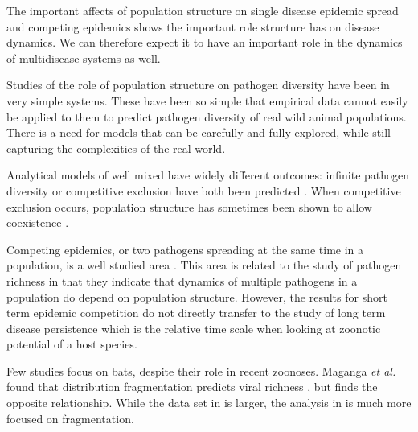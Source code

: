 The important affects of population structure on single disease epidemic spread and competing epidemics shows the important role structure has on disease dynamics.
We can therefore expect it to have an important role in the dynamics of multidisease systems as well.

 

Studies of the role of population structure on pathogen diversity have been in very simple systems.
These have been so simple that empirical data cannot easily be applied to them to predict pathogen diversity of real wild animal populations.
There is a need for models that can be carefully and fully explored, while still capturing the complexities of the real world.

Analytical models of well mixed have widely different outcomes: infinite pathogen diversity \cite{may1994superinfection, ackleh2014robust} or competitive exclusion have both been predicted \cite{ackleh2003competitive,bremermann1989competitive,martcheva2013competitive,qiu2013vector,allen2004sis}.
When competitive exclusion occurs, population structure has sometimes been shown to allow coexistence \cite{qiu2013vector,allen2004sis, nunes2006localized}.

Competing epidemics, or two pathogens spreading at the same time in a population, is a well studied area \cite{poletto2013host, poletto2015characterising, karrer2011competing}. 
This area is related to the study of pathogen richness in that they indicate that dynamics of multiple pathogens in a population do depend on population structure.
However, the results for short term epidemic competition do not directly transfer to the study of long term disease persistence which is the relative time scale when looking at zoonotic potential of a host species.








Few studies focus on bats, despite their role in recent zoonoses.
Maganga \emph{et al.} found that distribution fragmentation predicts viral richness \cite{maganga2014bat}, but \cite{gay2014parasite} finds the opposite relationship. 
While the data set in \cite{gay2014parasite} is larger, the analysis in \cite{maganga2014bat} is much more focused on fragmentation.

